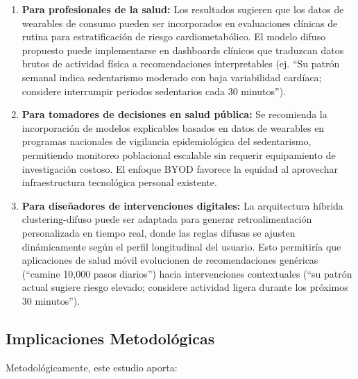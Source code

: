 \begin{enumerate}
    \item \textbf{Para profesionales de la salud:} Los resultados sugieren que los datos de wearables de consumo pueden ser incorporados en evaluaciones clínicas de rutina para estratificación de riesgo cardiometabólico. El modelo difuso propuesto puede implementarse en dashboards clínicos que traduzcan datos brutos de actividad física a recomendaciones interpretables (ej. ``Su patrón semanal indica sedentarismo moderado con baja variabilidad cardíaca; considere interrumpir periodos sedentarios cada 30 minutos'').
    
    \item \textbf{Para tomadores de decisiones en salud pública:} Se recomienda la incorporación de modelos explicables basados en datos de wearables en programas nacionales de vigilancia epidemiológica del sedentarismo, permitiendo monitoreo poblacional escalable sin requerir equipamiento de investigación costoso. El enfoque BYOD favorece la equidad al aprovechar infraestructura tecnológica personal existente.
    
    \item \textbf{Para diseñadores de intervenciones digitales:} La arquitectura híbrida clustering-difuso puede ser adaptada para generar retroalimentación personalizada en tiempo real, donde las reglas difusas se ajusten dinámicamente según el perfil longitudinal del usuario. Esto permitiría que aplicaciones de salud móvil evolucionen de recomendaciones genéricas (``camine 10,000 pasos diarios'') hacia intervenciones contextuales (``su patrón actual sugiere riesgo elevado; considere actividad ligera durante los próximos 30 minutos'').
\end{enumerate}

\subsection{Implicaciones Metodológicas}
\label{subsec:implicaciones_metodologicas}

Metodológicamente, este estudio aporta:

